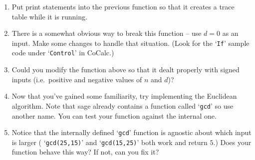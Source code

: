 \documentclass{amsart}
\begin{document}
\begin{enumerate}
{\tt division\_alg(23,7)}

(but pick your own inputs.)

\vfill

\item Put print statements into the previous function so that it creates a trace table while it is running.

\vfill

\item There is a somewhat obvious way to break this function -- use $d=0$ as an input.  Make some changes to handle that situation.  (Look for the `{\tt If}' sample code under `{\tt Control}' in CoCalc.)

\vfill

\item Could you modify the function above so that it dealt properly with signed inputs (i.e.\ positive and negative values of $n$ and $d$)?

\vfill

\item Now that you've gained some familiarity, try implementing the Euclidean algorithm.  Note that sage already contains a function called `{\tt gcd}' so use another name.  You can test your function against the internal one.

\vfill

\item Notice that the internally defined `{\tt gcd}' function is agnostic about which input is larger ( `{\tt gcd(25,15)}' and `{\tt gcd(15,25)}' both work and return $5$.)  Does your function behave this way?  If not, can you fix it?

\vfill


\end{enumerate}
\end{document}
